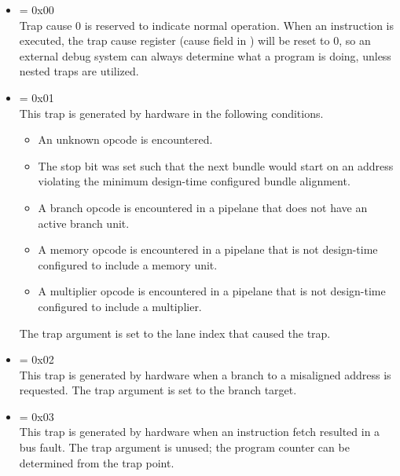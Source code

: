 \begin{itemize}
\setcounter{enumi}{-1}
\item {} \label{trap:NONE}  = 0x00
\\[6 pt]
Trap cause 0 is reserved to indicate normal operation. When an 
 instruction is executed, the trap cause register (cause field in 
) will be reset to 0, so an external debug system can always determine 
what a program is doing, unless nested traps are utilized.

\setcounter{enumi}{0}
\item {} \label{trap:INVALID_OP}  = 0x01
\\[6 pt]
This trap is generated by hardware in the following conditions.

\begin{itemize}

\item An unknown opcode is encountered.

\item The stop bit was set such that the next bundle would start on an address
violating the minimum design-time configured bundle alignment.

\item A branch opcode is encountered in a pipelane that does not have an active
branch unit.

\item A memory opcode is encountered in a pipelane that is not design-time
configured to include a memory unit.

\item A multiplier opcode is encountered in a pipelane that is not design-time
configured to include a multiplier.

\end{itemize}

\noindent The trap argument is set to the lane index that caused the trap.

\setcounter{enumi}{1}
\item {} \label{trap:MISALIGNED_BRANCH}  = 0x02
\\[6 pt]
This trap is generated by hardware when a branch to a misaligned address is
requested. The trap argument is set to the branch target.

\setcounter{enumi}{2}
\item {} \label{trap:FETCH_FAULT}  = 0x03
\\[6 pt]
This trap is generated by hardware when an instruction fetch resulted in a bus
fault. The trap argument is unused; the program counter can be determined from
the trap point.


\end{itemize}
